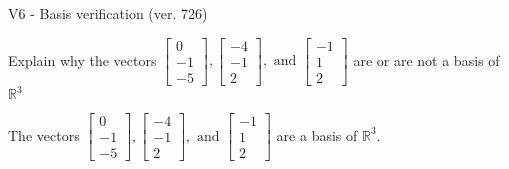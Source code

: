 \begin{exercise}
  \begin{exerciseTitle}V6 - Basis verification (ver. 726)\end{exerciseTitle}
  \begin{exerciseStatement}
    Explain why the vectors \(\left[\begin{array}{r}
0 \\
-1 \\
-5
\end{array}\right] , \left[\begin{array}{r}
-4 \\
-1 \\
2
\end{array}\right] , \text{ and } \left[\begin{array}{r}
-1 \\
1 \\
2
\end{array}\right]\) are or are not a basis of \(\mathbb{R}^3\)	


  \end{exerciseStatement}
  \begin{exerciseAnswer}
   The vectors \(\left[\begin{array}{r}
0 \\
-1 \\
-5
\end{array}\right] , \left[\begin{array}{r}
-4 \\
-1 \\
2
\end{array}\right] , \text{ and } \left[\begin{array}{r}
-1 \\
1 \\
2
\end{array}\right]\) 
  	 are  a basis of \(\mathbb{R}^3\).
  


  \end{exerciseAnswer}
\end{exercise}